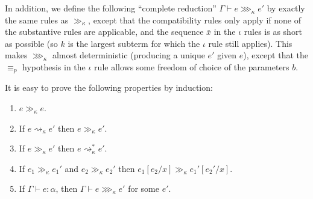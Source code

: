 In addition, we define the following ``complete reduction'' $\Gamma\vdash e\ggg_\kappa e'$ by exactly the same rules as $\gg_\kappa$, except that the compatibility rules only apply if none of the substantive rules are applicable, and the sequence $\bar x$ in the $\iota$ rules is as short as possible (so $k$ is the largest subterm for which the $\iota$ rule still applies). This makes $\ggg_\kappa$ almost deterministic (producing a unique $e'$ given $e$), except that the $\equiv_p$ hypothesis in the $\iota$ rule allows some freedom of choice of the parameters $b$.

It is easy to prove the following properties by induction:
\begin{lemma}\label{gg_prop}
\begin{enumerate}
\item $e\gg_\kappa e$.
\item\label{red_gg} If $e\rightsquigarrow_\kappa e'$ then $e\gg_\kappa e'$.
\item\label{gg_red} If $e\gg_\kappa e'$ then $e\rightsquigarrow_\kappa^* e'$.
\item\label{gg_subst} If $e_1\gg_\kappa e_1'$ and $e_2\gg_\kappa e_2'$ then $e_1[e_2/x]\gg_\kappa e_1'[e_2'/x]$.
\item\label{ggg_ex} If $\Gamma\vdash e:\alpha$, then $\Gamma\vdash e\ggg_\kappa e'$ for some $e'$.
\end{enumerate}
\end{lemma}


